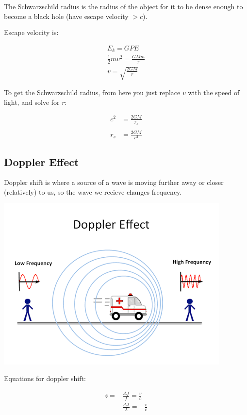 \documentclass[a4paper, 12pt]{article}
\begin{document}
The Schwarzschild radius is the radius of the object for it to be dense enough to become a black hole (have escape velocity $> c$).

Escape velocity is:

\begin{gather*}
E_k = GPE \\
\frac{1}{2} mv^2 = \frac{GMm}{r} \\
v = \sqrt{\frac{2GM}{r}}
\end{gather*}

To get the Schwarzschild radius, from here you just replace $v$ with the speed of light, and solve for $r$:

\begin{align*}
c^2 &= \frac{2GM}{r_s} \\\\
r_s &= \frac{2GM}{c^2}
\end{align*}

\subsection{Doppler Effect}

Doppler shift is where a source of a wave is moving further away or closer (relatively) to us, so the wave we recieve changes frequency.

\includegraphics[width=\textwidth]{images/doppler.png}

Equations for doppler shift:

\begin{align*}
z = &\frac{\Delta f}{f} = \frac{v}{c} \\
  &\frac{\Delta \lambda}{\lambda} = -\frac{v}{c}
\end{align*}
\end{document}

